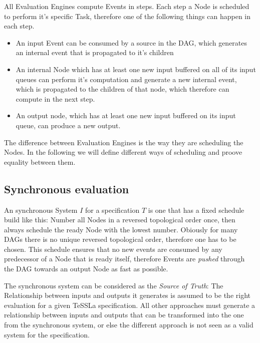 All Evaluation Engines compute Events in steps.
Each step a Node is scheduled to perform it's specific Task, therefore one of the following things can happen in each step.

\begin{itemize}
  \item An input Event can be consumed by a source in the DAG, which generates an internal event that is propagated to it's children
  \item An internal Node which has at least one new input buffered on all of its input queues can perform
    it's computation and generate a new internal event, which is propagated to the children of that node, which therefore can compute in the next step.
  \item An output node, which has at least one new input buffered on its input queue, can produce a new output.
\end{itemize}

The difference between Evaluation Engines is the way they are scheduling the Nodes.
In the following we will define different ways of scheduling and proove equality between them.

\subsection{Synchronous evaluation}
\label{sec:concepts:behaviour_without_timing:synchronous}

An synchronous System \(I\) for a specification \(T\) is one that has a fixed schedule build like this:
Number all Nodes in a reversed topological order once, then always schedule the ready Node with the lowest number.
Obiously for many DAGs there is no unique reversed topological order, therefore one has to be chosen.
This schedule ensures that no new events are consumed by any predecessor of a Node that is ready itself, therefore Events are \emph{pushed} through the DAG towards an output Node as fast as possible.

The synchronous system can be considered as the \emph{Source of Truth}: The Relationship between inputs and outputs it generates
is assumed to be the right evaluation for a given TeSSLa specification.
All other approaches must generate a relationship between inputs and outputs that can be transformed into the one from the synchronous system,
or else the different approach is not seen as a valid system for the specification.

